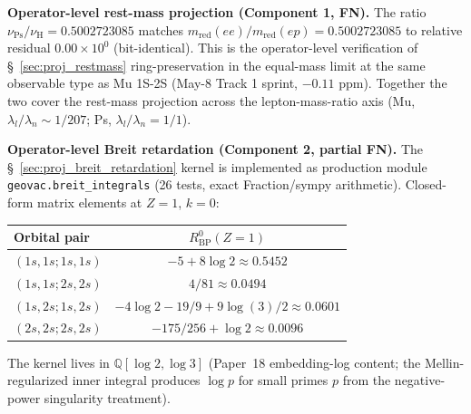 \documentclass[11pt]{article}
\begin{document}
\textbf{Operator-level rest-mass projection (Component 1, FN).}  The
ratio $\nu_\text{Ps}/\nu_\text{H} = 0.5002723085$ matches
$m_\text{red}(ee)/m_\text{red}(ep) = 0.5002723085$ to relative residual
$0.00 \times 10^{0}$ (bit-identical).  This is the operator-level
verification of \S~\ref{sec:proj_restmass} ring-preservation in the
equal-mass limit at the same observable type as Mu 1S-2S (May-8 Track 1
sprint, $-0.11$ ppm).  Together the two cover the rest-mass projection
across the lepton-mass-ratio axis (Mu, $\lambda_l/\lambda_n \sim 1/207$;
Ps, $\lambda_l/\lambda_n = 1/1$).

\textbf{Operator-level Breit retardation (Component 2, partial FN).}  The
\S~\ref{sec:proj_breit_retardation} kernel is implemented as production
module \texttt{geovac.breit\_integrals} (26 tests, exact
Fraction/sympy arithmetic).  Closed-form matrix elements at $Z=1$, $k=0$:

\begin{table}[h]
\centering\small
\begin{tabular}{l c}
\toprule
Orbital pair & $R^0_\text{BP}(Z=1)$ \\
\midrule
$(1s,1s; 1s,1s)$ & $-5 + 8\log 2 \approx 0.5452$ \\
$(1s,1s; 2s,2s)$ & $4/81 \approx 0.0494$ \\
$(1s,2s; 1s,2s)$ & $-4\log 2 - 19/9 + 9\log(3)/2 \approx 0.0601$ \\
$(2s,2s; 2s,2s)$ & $-175/256 + \log 2 \approx 0.0096$ \\
\bottomrule
\end{tabular}
\end{table}

\noindent
The kernel lives in $\mathbb{Q}[\log 2, \log 3]$ (Paper~18 embedding-log
content; the Mellin-regularized inner integral produces $\log p$ for
small primes $p$ from the negative-power singularity treatment).
\end{document}
